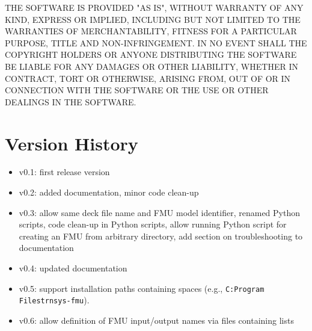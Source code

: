 THE SOFTWARE IS PROVIDED "AS IS", WITHOUT WARRANTY OF ANY KIND, EXPRESS OR
IMPLIED, INCLUDING BUT NOT LIMITED TO THE WARRANTIES OF MERCHANTABILITY,
FITNESS FOR A PARTICULAR PURPOSE, TITLE AND NON-INFRINGEMENT. IN NO EVENT
SHALL THE COPYRIGHT HOLDERS OR ANYONE DISTRIBUTING THE SOFTWARE BE LIABLE
FOR ANY DAMAGES OR OTHER LIABILITY, WHETHER IN CONTRACT, TORT OR OTHERWISE,
ARISING FROM, OUT OF OR IN CONNECTION WITH THE SOFTWARE OR THE USE OR OTHER
DEALINGS IN THE SOFTWARE.

\section{Version History}

\begin{itemize}
  \item v0.1: first release version
  \item v0.2: added documentation, minor code clean-up
  \item v0.3: allow same deck file name and FMU model identifier, renamed Python scripts, code clean-up in Python scripts, allow running Python script for creating an FMU from arbitrary directory, add section on troubleshooting to documentation
  \item v0.4: updated documentation
  \item v0.5: support installation paths containing spaces (e.g., \texttt{C:Program Filestrnsys-fmu}).
  \item v0.6: allow definition of FMU input/output names via files containing lists
\end{itemize}
